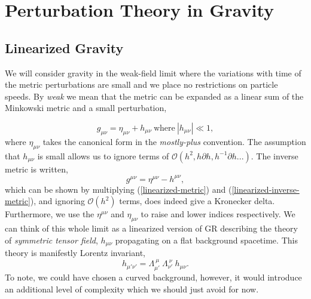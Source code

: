 \chapter{Perturbation Theory in Gravity}
\section{Linearized Gravity}
We will consider gravity in the weak-field limit where the variations with time of the metric perturbations are small and we place no restrictions on particle speeds. By \textit{weak} we mean that the metric can be expanded as a linear sum of the Minkowski metric and a small perturbation,

\begin{equation}\label{linearized-metric}
    g_{\mu\nu} = \eta_{\mu\nu} + h_{\mu\nu} \  \text{where} \  |h_{\mu\nu}|\ll 1, 
\end{equation}
where $\eta_{\mu\nu}$ takes the canonical form in the \textit{mostly-plus} convention. The assumption that $h_{\mu\nu}$ is small allows us to ignore terms of $\mathcal{O}(h^2, h\partial h, h^{-1}\partial h...)$. The inverse metric is written, 
\begin{equation}\label{linearized-inverse-metric}
    g^{\mu\nu} = \eta^{\mu\nu} - h^{\mu\nu},
\end{equation}
which can be shown by multiplying (\ref{linearized-metric}) and (\ref{linearized-inverse-metric}), and ignoring $\mathcal{O}(h^2)$ terms, does indeed give a Kronecker delta. Furthermore, we use the $\eta^{\mu\nu}$ and $\eta_{\mu\nu}$ to raise and lower indices respectively. We can think of this whole limit as a linearized version of GR describing the theory of \textit{symmetric tensor field}, $h_{\mu\nu}$ propagating on a flat background spacetime. This theory is manifestly Lorentz invariant, 
\begin{equation}
    h_{\mu'\nu'} = \Lambda_{\mu'}^{\ \mu}\ \Lambda_{\nu'}^{\ \nu}\ h_{\mu\nu}.
\end{equation}
To note, we could have chosen a curved background, however, it would introduce an additional level of complexity which we should just avoid for now. 

